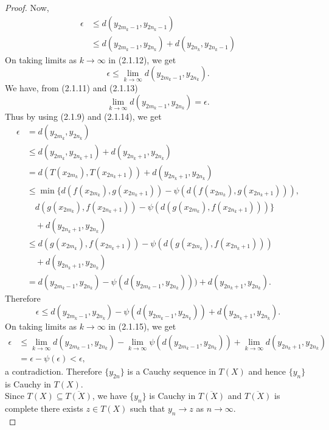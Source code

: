 \documentclass[11]{article}
\numberwithin{equation}{definition}
\begin{document}
\begin{proof}
Now,
\begin{align}
\epsilon &\leq d(y_{2m_{k}-1},y_{2n_{k}-1}) \nonumber\\
&\leq d(y_{2m_{k}-1},y_{2n_{k}})+d(y_{2n_{k}},y_{2n_{k}-1})
\end{align}
On taking limits as $k\to\infty$ in (2.1.12), we get
\begin{equation}
\epsilon\leq\lim_{k\to\infty}d(y_{2m_{k}-1},y_{2n_{k}}).
\end{equation}
We have, from (2.1.11) and (2.1.13)
\begin{equation}
\lim_{k\to\infty}d(y_{2m_{k}-1},y_{2n_{k}})=\epsilon.
\end{equation}
Thus by using (2.1.9) and (2.1.14), we get
\begin{align*}
\epsilon &= d(y_{2m_{k}},y_{2n_{k}}) \\
&\leq d(y_{2m_{k}},y_{2n_{k}+1})+d(y_{2n_{k}+1},y_{2n_{k}}) \\
&= d(T(x_{2m_{k}}),T(x_{2n_{k}+1}))+d(y_{2n_{k}+1},y_{2n_{k}}) \\
&\leq \min\{d(f(x_{2m_{k}}),g(x_{2n_{k}+1}))-\psi(d(f(x_{2m_{k}}),g(x_{2n_{k}+1}))), \\
&\quad d(g(x_{2m_{k}}),f(x_{2n_{k}+1}))-\psi(d(g(x_{2m_{k}}),f(x_{2n_{k}+1})))\} \\
&\quad +d(y_{2n_{k}+1},y_{2n_{k}}) \\
&\leq d(g(x_{2m_{k}}),f(x_{2n_{k}+1}))-\psi(d(g(x_{2m_{k}}),f(x_{2n_{k}+1}))) \\
&\quad +d(y_{2n_{k}+1},y_{2n_{k}}) \\
&= d(y_{2m_{k}-1},y_{2n_{k}})-\psi(d(y_{2m_{k}-1},y_{2n_{k}})))+d(y_{2n_{k}+1},y_{2n_{k}}).
\end{align*}
Therefore
\begin{equation}
\epsilon \leq d(y_{2m_{k}-1},y_{2n_{k}})-\psi(d(y_{2m_{k}-1},y_{2n_{k}}))+d(y_{2n_{k}+1},y_{2n_{k}}).
\end{equation}
On taking limits as $k\to\infty$ in (2.1.15), we get
\begin{align*}
\epsilon &\leq \lim_{k\to\infty}d(y_{2m_{k}-1},y_{2n_{k}})-\lim_{k\to\infty}\psi(d(y_{2m_{k}-1},y_{2n_{k}}))+\lim_{k\to\infty}d(y_{2n_{k}+1},y_{2n_{k}}) \\
&= \epsilon-\psi(\epsilon)<\epsilon,
\end{align*}
a contradiction.
Therefore $\{y_{2n}\}$ is a Cauchy sequence in $T(X)$ and hence $\{y_{n}\}$ is Cauchy in $T(X)$.\\
Since $T(X)\subseteq\overline{T(X)}$, we have $\{y_{n}\}$ is Cauchy in $\overline{T(X)}$ and $\overline{T(X)}$ is complete there exists $z\in T(X)$ such that $y_{n}\to z$ as $n\to\infty$.\\

\end{proof}
\end{document}
